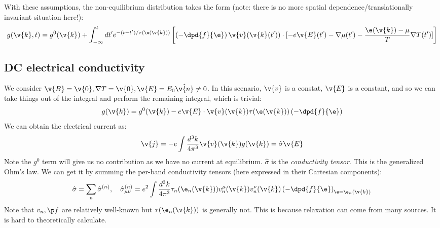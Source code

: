 With these assumptions, the non-equilibrium distribution takes the form (note: there is no more spatial dependence/translationally invariant situation here!):
\begin{equation}
    g(\v{k}, t) = g^0(\v{k}) + \int_{-\infty}^t dt' e^{-(t-t')/\tau(\e(\v{k}))}\left[\left(-\dpd{f}{\e}\right) \v{v}(\v{k}(t')) \cdot [-e\v{E}(t') - \nabla \mu(t') - \frac{\e(\v{k}) - \mu}{T}\nabla T(t')]\right]
\end{equation}

\subsection{DC electrical conductivity}
We consider $\v{B} = \v{0}, \nabla T = \v{0}, \v{E} = E_0\hat{\v{n}} \neq 0$. In this scenario, $\v{v}$ is a constat, $\v{E}$ is a constant, and so we can take things out of the integral and perform the remaining integral, which is trivial:
\begin{equation}
    g(\v{k}) = g^0(\v{k}) - e\v{E}\cdot \v{v}(\v{k})\tau(\e(\v{k}))\left(-\dpd{f}{\e}\right)
\end{equation}
We can obtain the electrical current as:
\begin{equation}
    \v{j} = -e \int \frac{d^3k}{4\pi^3} \v{v}(\v{k})g(\v{k}) = \hat{\sigma}\v{E}
\end{equation}
Note the $g^0$ term will give us no contribution as we have no current at equilibrium. $\hat{\sigma}$ is the \emph{conductivity tensor}. This is the generalized Ohm's law. We can get it by summing the per-band conductivity tensors (here expressed in their Cartesian components):
\begin{equation}
    \hat{\sigma} = \sum_n \hat{\sigma}^{(n)}, \quad \hat{\sigma}^{(n)}_{\mu\nu} = e^2 \int \frac{d^3k}{4\pi^3}\tau_n(\e_n(\v{k}))v_n^\mu (\v{k})v_n^\nu(\v{k})\left(-\dpd{f}{\e}\right)_{\e = \e_n(\v{k})}
\end{equation}
Note that $v_n, \p f$ are relatively well-known but $\tau(\e_n(\v{k}))$ is generally not. This is because relaxation can come from many sources. It is hard to theoretically calculate.

